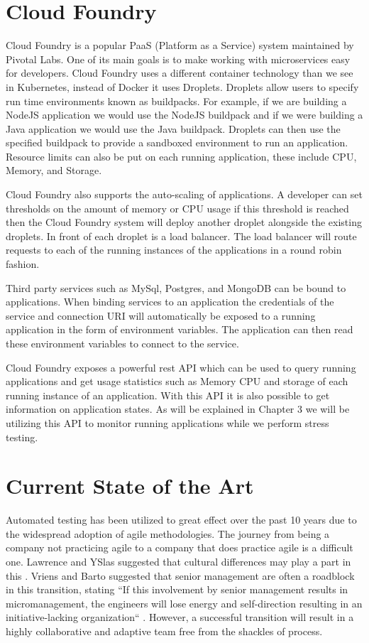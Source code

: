 \section{Cloud Foundry}

Cloud Foundry is a popular PaaS (Platform as a Service) system maintained by Pivotal Labs. One of its main goals is to make working with microservices easy for developers. Cloud Foundry uses a different container technology than we see in Kubernetes, instead of Docker it uses Droplets. Droplets allow users to specify run time environments known as buildpacks. For example, if we are building a NodeJS application we would use the NodeJS buildpack and if we were building a Java application we would use the Java buildpack. Droplets can then use the specified buildpack to provide a sandboxed environment to run an application. Resource limits can also be put on each running application, these include CPU, Memory, and Storage.

Cloud Foundry also supports the auto-scaling of applications. A developer can set thresholds on the amount of memory or CPU usage if this threshold is reached then the Cloud Foundry system will deploy another droplet alongside the existing droplets. In front of each droplet is a load balancer. The load balancer will route requests to each of the running instances of the applications in a round robin fashion.

Third party services such as MySql, Postgres, and MongoDB can be bound to applications. When binding services to an application the credentials of the service and connection URI will automatically be exposed to a running application in the form of environment variables. The application can then read these environment variables to connect to the service.

Cloud Foundry exposes a powerful rest API which can be used to query running applications and get usage statistics such as Memory CPU and storage of each running instance of an application. With this API it is also possible to get information on application states. As will be explained in Chapter 3 we will be utilizing this API to monitor running applications while we perform stress testing.

\section{Current State of the Art}

Automated testing has been utilized to great effect over the past 10 years due to the widespread adoption of agile methodologies. The journey from being a company not practicing agile to a company that does practice agile is a difficult one. Lawrence and YSlas suggested that cultural differences may play a part in this \cite{1667587}. Vriens and Barto suggested that senior management are often a roadblock in this transition, stating ``If this involvement by senior management results in micromanagement, the engineers will lose energy and self-direction resulting in an initiative-lacking organization`` \cite{4599511}. However, a successful transition will result in a highly collaborative and adaptive team free from the shackles of process.

